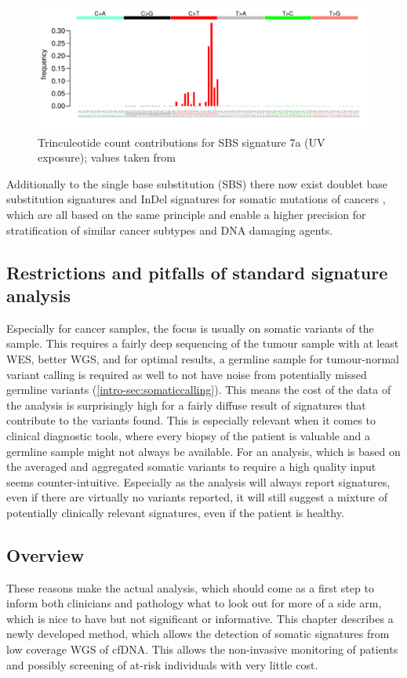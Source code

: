 \begin{figure}[!ht]
\centering
\includegraphics[width=.99\linewidth]{Figures/SBS7aSignature.pdf}
\caption[Trinculeotide count contributions for single base substitution (SBS) signature 7a]{Trinculeotide count contributions for SBS signature 7a (UV exposure); values taken from \protect\textcite{Alexandrov2020}}\label{fig:sig7a}
\end{figure}

Additionally to the single base substitution (SBS) there now exist doublet base substitution signatures and InDel signatures for somatic mutations of cancers \cite{Alexandrov2020}, which are all based on the same principle and enable a higher precision for stratification of similar cancer subtypes and DNA damaging agents.

\subsection{Restrictions and pitfalls of standard signature analysis}
Especially for cancer samples, the focus is usually on somatic variants of the sample. This requires a fairly deep sequencing of the tumour sample with at least WES, better WGS, and for optimal results, a germline sample for tumour-normal variant calling is required as well to not have noise from potentially missed germline variants (\autoref{intro-sec:somaticcalling}). This means the cost of the data of the analysis is surprisingly high for a fairly diffuse result of signatures that contribute to the variants found. This is especially relevant when it comes to clinical diagnostic tools, where every biopsy of the patient is valuable and a germline sample might not always be available. For an analysis, which is based on the averaged and aggregated somatic variants to require a high quality input seems counter-intuitive.
Especially as the analysis will always report signatures, even if there are virtually no variants reported, it will still suggest a mixture of potentially clinically relevant signatures, even if the patient is healthy.

\subsection{Overview}
These reasons make the actual analysis, which should come as a first step to inform both clinicians and pathology what to look out for more of a side arm, which is nice to have but not significant or informative. This chapter describes a newly developed method, which allows the detection of somatic signatures from low coverage WGS of cfDNA. This allows the non-invasive monitoring of patients and possibly screening of at-risk individuals with very little cost.
